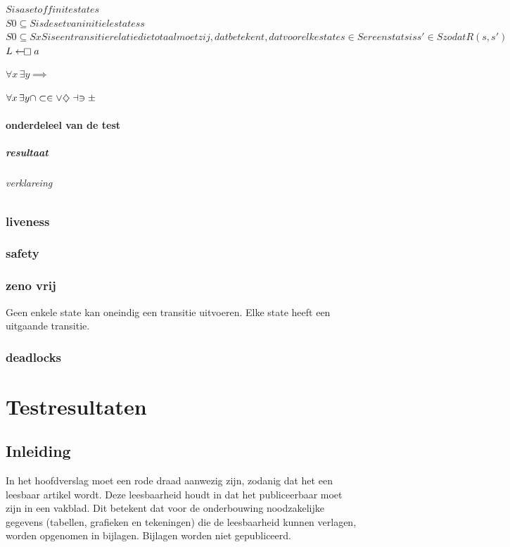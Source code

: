 $S is a set of finite states$\\
$S0 \subseteq S is de set van initiele statess$ \\
$S0 \subseteq S xS  is een transitie relatie die totaal moet zij, dat betekent, dat voor elke state s \in S er een stats is s' \in S zodat R(s,s')$
$L\gets\mathrel{\mkern-2.4mu\mathop\square} a$

$\forall x\,\exists y \implies $

$\forall x\,\exists y \cap \subset \in \vee \diamondsuit \dashv \ni \pm$


\subsubsection{onderdeleel van de test}
\paragraph{resultaat}
\subparagraph{verklareing}


\subsection{liveness}


\subsection{safety}


\subsection{zeno vrij}
Geen enkele state kan oneindig een transitie uitvoeren. Elke state heeft een uitgaande transitie.

\subsection{deadlocks}


 

 




	\chapter{Testresultaten}
	
	\section{Inleiding}
	In het hoofdverslag moet een rode draad aanwezig zijn,
	zodanig dat het een leesbaar artikel wordt. Deze leesbaarheid houdt in
	dat het publiceerbaar moet zijn in een vakblad. Dit betekent dat voor
	de onderbouwing noodzakelijke gegevens (tabellen, grafieken en
	tekeningen) die de leesbaarheid kunnen verlagen, worden opgenomen in
	bijlagen. Bijlagen worden niet gepubliceerd.
	
